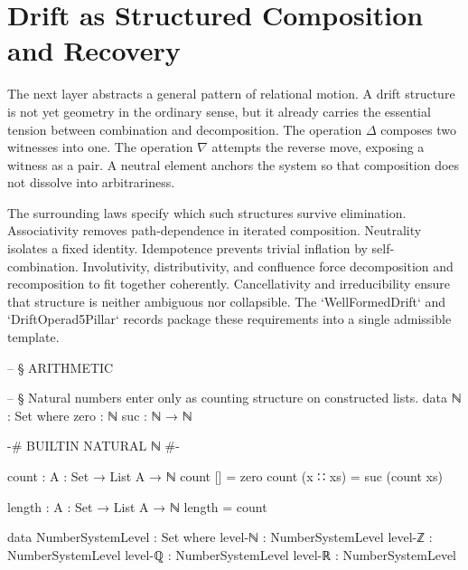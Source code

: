 \documentclass[11pt,a4paper]{book}
\begin{document}
\section{Drift as Structured Composition and Recovery}

The next layer abstracts a general pattern of relational motion. A drift structure is not yet geometry in the ordinary sense, but it already carries the essential tension between combination and decomposition. The operation $\Delta$ composes two witnesses into one. The operation $\nabla$ attempts the reverse move, exposing a witness as a pair. A neutral element anchors the system so that composition does not dissolve into arbitrariness.

The surrounding laws specify which such structures survive elimination. Associativity removes path-dependence in iterated composition. Neutrality isolates a fixed identity. Idempotence prevents trivial inflation by self-combination. Involutivity, distributivity, and confluence force decomposition and recomposition to fit together coherently. Cancellativity and irreducibility ensure that structure is neither ambiguous nor collapsible. The `WellFormedDrift` and `DriftOperad5Pillar` records package these requirements into a single admissible template.

\begin{center}
\end{center}

\begin{code}


-- § ARITHMETIC

-- § Natural numbers enter only as counting structure on constructed lists.
data ℕ : Set where
  zero : ℕ
  suc  : ℕ → ℕ

{-# BUILTIN NATURAL ℕ #-}

count : {A : Set} → List A → ℕ
count []       = zero
count (x ∷ xs) = suc (count xs)

length : {A : Set} → List A → ℕ
length = count

data NumberSystemLevel : Set where
  level-ℕ : NumberSystemLevel
  level-ℤ : NumberSystemLevel
  level-ℚ : NumberSystemLevel
  level-ℝ : NumberSystemLevel
\end{code}
\end{document}
